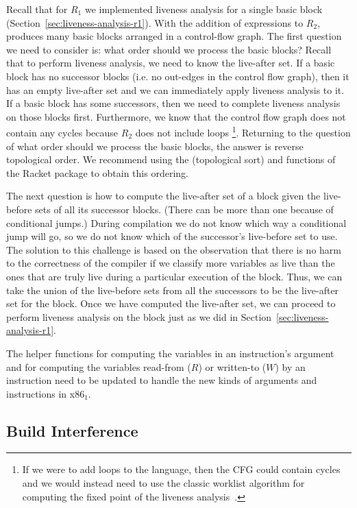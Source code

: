 \documentclass[11pt]{book}
\begin{document}
Recall that for $R_1$ we implemented liveness analysis for a single
basic block (Section~\ref{sec:liveness-analysis-r1}). With the
addition of  expressions to $R_2$, 
produces many basic blocks arranged in a control-flow graph. The first
question we need to consider is: what order should we process the
basic blocks? Recall that to perform liveness analysis, we need to
know the live-after set. If a basic block has no successor blocks
(i.e. no out-edges in the control flow graph), then it has an empty
live-after set and we can immediately apply liveness analysis to
it. If a basic block has some successors, then we need to complete
liveness analysis on those blocks first.  Furthermore, we know that
the control flow graph does not contain any cycles because $R_2$ does
not include loops
%
\footnote{If we were to add loops to the language, then the CFG could
  contain cycles and we would instead need to use the classic worklist
  algorithm for computing the fixed point of the liveness
  analysis~\citep{Aho:1986qf}.}.
%
Returning to the question of what order should we process the basic
blocks, the answer is reverse topological order. We recommend using
the  (topological sort) and  functions of
the Racket  package to obtain this ordering.

The next question is how to compute the live-after set of a block
given the live-before sets of all its successor blocks.  (There can be
more than one because of conditional jumps.)  During compilation we do
not know which way a conditional jump will go, so we do not know which
of the successor's live-before set to use.  The solution to this
challenge is based on the observation that there is no harm to the
correctness of the compiler if we classify more variables as live than
the ones that are truly live during a particular execution of the
block. Thus, we can take the union of the live-before sets from all
the successors to be the live-after set for the block. Once we have
computed the live-after set, we can proceed to perform liveness
analysis on the block just as we did in
Section~\ref{sec:liveness-analysis-r1}.

The helper functions for computing the variables in an instruction's
argument and for computing the variables read-from ($R$) or written-to
($W$) by an instruction need to be updated to handle the new kinds of
arguments and instructions in x86$_1$.

\subsection{Build Interference}
\label{sec:build-interference-r2}
\end{document}
